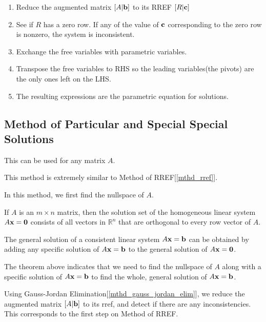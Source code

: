 \documentclass{report}
\begin{document}
		\begin{enumerate}
			\item Reduce the augmented matrix $\left[A|\bf{b}\right]$ to its RREF $\left[R|\bf{c}\right]$
			\item See if $R$ has a zero row. If any of the value of $\bf{c}$ corresponding to the zero row is nonzero, the system is inconsistent.
			\item Exchange the free variables with parametric variables.
			\item Transpose the free variables to RHS so the leading variables(the pivots) are the only ones left on the LHS.
			\item The resulting expressions are the parametric equation for solutions.
		\end{enumerate}
		
		\subsection{Method of Particular and Special Special Solutions}
			
			This can be used for any matrix $A$.
			
			This method is extremely similar to Method of RREF[\ref{mthd_rref}].
			
			In this method, we first find the nullspace of $A$.
			
			\begin{thm}
				If $A$ is an $m \times n$ matrix, then the solution set of the homogeneous linear system $A\bf{x}=\bf{0}$ consists of all vectors in $\mathbb{R}^n$ that are orthogonal to every row vector of $A$.
			\end{thm}
			
			\begin{thm}
				The general solution of a consistent linear system $A\bf{x}=\bf{b}$ can be obtained by adding any specific solution of $A\bf{x}=\bf{b}$ to the general solution of $A\bf{x}=\bf{0}$.
			\end{thm}
			
			The theorem above indicates that we need to find the nullspace of $A$ along with a specific solution of $A\bf{x}=\bf{b}$ to find the whole, general solution of $A\bf{x}=\bf{b}$.
			
			Using Gauss-Jordan Elimination[\ref{mthd_gauss_jordan_elim}], we reduce the augmented matrix $\left[A|\bf{b}\right]$ to its rref, and detect if there are any inconsistencies. This corresponds to the first step on Method of RREF.
			
\end{document}
